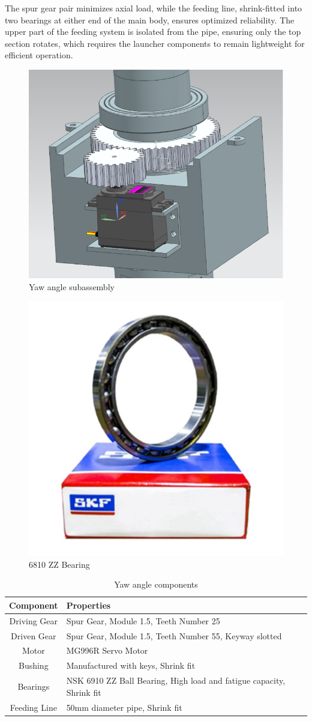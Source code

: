 \documentclass[12pt]{article}
\begin{document}
The spur gear pair minimizes axial load, while the feeding line, shrink-fitted into two bearings at either end of the main body, ensures optimized reliability. The upper part of the feeding system is isolated from the pipe, ensuring only the top section rotates, which requires the launcher components to remain lightweight for efficient operation.

\begin{figure}[h!]
    \centering
    \includegraphics[width=0.5\linewidth]{2.3.3.1.png}
    \caption{Yaw angle subassembly}
    \label{fig:enter-label}
\end{figure}

\begin{figure}[h!]
    \centering
    \includegraphics[width=0.3\linewidth]{2.3.3.2.png}
    \caption{6810 ZZ Bearing}
    \label{fig:enter-label}
\end{figure}

\begin{table}[h!]
\scriptsize
\centering
\caption{Yaw angle components}
\begin{tabular}{|c|p{9cm}|}
\hline
\textbf{Component} & \textbf{Properties} \\ \hline
Driving Gear & Spur Gear, Module 1.5, Teeth Number 25 \\ \hline
Driven Gear & Spur Gear, Module 1.5, Teeth Number 55, Keyway slotted \\ \hline
Motor & MG996R Servo Motor \\ \hline
Bushing & Manufactured with keys, Shrink fit \\ \hline
Bearings & NSK 6910 ZZ Ball Bearing, High load and fatigue capacity, Shrink fit \\ \hline
Feeding Line & 50mm diameter pipe, Shrink fit \\ \hline
\end{tabular}
\label{table:yaw_components}
\end{table}
\end{document}
